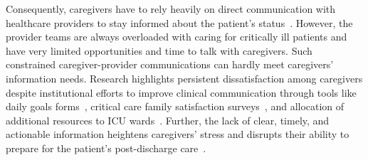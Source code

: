 Consequently, caregivers have to rely heavily on direct communication with healthcare providers to stay informed about the patient’s status~\cite{yoo2020critical}. 
However, the provider teams are always overloaded with caring for critically ill patients and have very limited opportunities and time to talk with caregivers.
Such constrained caregiver-provider communications can hardly meet caregivers' information needs.
Research highlights persistent dissatisfaction among caregivers despite institutional efforts to improve clinical communication through tools like daily goals forms~\cite{pronovost2003improving}, critical care family satisfaction surveys~\cite{steel2008impact}, and allocation of additional resources to ICU wards~\cite{breslow2005technology}. 
Further, the lack of clear, timely, and actionable information heightens caregivers' stress and disrupts their ability to prepare for the patient’s post-discharge care~\cite{azoulay2016communication}.


